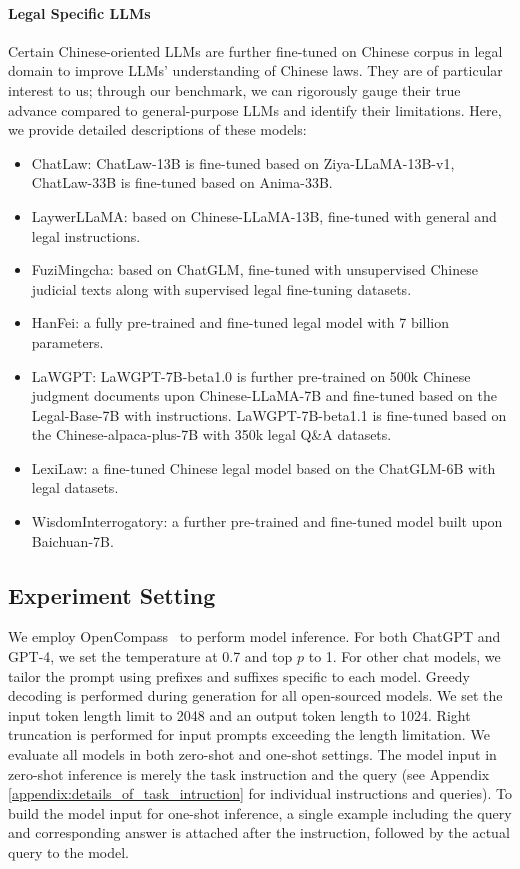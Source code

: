 \paragraph{Legal Specific LLMs} Certain Chinese-oriented LLMs are further fine-tuned on Chinese corpus in legal domain to improve LLMs' understanding of Chinese laws. They are of particular interest to us; through our benchmark, we can rigorously gauge their true advance compared to general-purpose LLMs and identify their limitations. Here, we provide detailed descriptions of these models: 
\begin{itemize}
    \item ChatLaw\cite{cui2023chatlaw}: ChatLaw-13B is fine-tuned based on Ziya-LLaMA-13B-v1, ChatLaw-33B is fine-tuned based on Anima-33B.
    \item LaywerLLaMA\cite{huang2023lawyer}: based on Chinese-LLaMA-13B, fine-tuned with general and legal instructions.
    \item FuziMingcha\cite{fuzi.mingcha}: based on ChatGLM, fine-tuned with unsupervised Chinese judicial texts along with supervised legal fine-tuning datasets.
    \item HanFei\cite{HanFei2023}: a fully pre-trained and fine-tuned legal model with 7 billion parameters.
    \item LaWGPT\cite{LaWGPT2023}: LaWGPT-7B-beta1.0 is further pre-trained on 500k Chinese judgment documents upon Chinese-LLaMA-7B and fine-tuned based on the Legal-Base-7B with instructions. LaWGPT-7B-beta1.1 is fine-tuned based on the Chinese-alpaca-plus-7B with 350k legal Q\&A datasets.
    \item LexiLaw\cite{LexiLaw2023}: a fine-tuned Chinese legal model based on the ChatGLM-6B with legal datasets. 
    \item WisdomInterrogatory\cite{WisdomInterrogatory2023}: a further pre-trained and fine-tuned model built upon Baichuan-7B.
\end{itemize}

\subsection{Experiment Setting}
We employ OpenCompass~\cite{2023opencompass} to perform model inference. For both ChatGPT and GPT-4, we set the temperature at 0.7 and top $p$ to 1. For other chat models, we tailor the prompt using prefixes and suffixes specific to each model. Greedy decoding is performed during generation for all open-sourced models. We set the input token length limit to 2048 and an output token length to 1024. Right truncation is performed for input prompts exceeding the length limitation. We evaluate all models in both zero-shot and one-shot settings. The model input in zero-shot inference is merely the task instruction and the query (see Appendix \ref{appendix:details_of_task_intruction} for individual instructions and queries). To build the model input for one-shot inference, a single example including the query and corresponding answer is attached after the instruction, followed by the actual query to the model.

